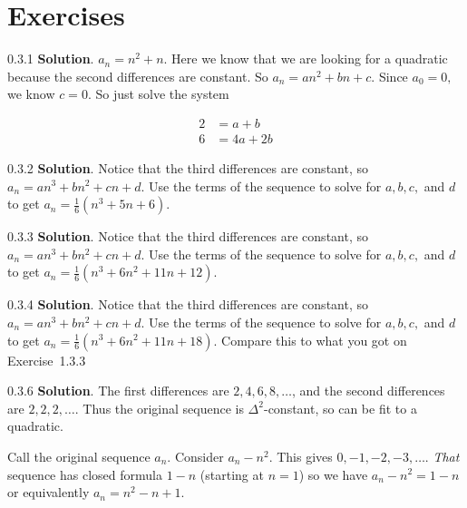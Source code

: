\documentclass[11pt,]{book}
\theoremstyle{ptxplainnotitle}
\theoremstyle{ptxplaintitle}
\theoremstyle{ptxdefinitionnotitle}
\theoremstyle{ptxdefinitiontitle}
\theoremstyle{ptxdefinitionnotitle}
\theoremstyle{ptxdefinitiontitle}
\theoremstyle{ptxdefinitionnotitle}
\theoremstyle{ptxdefinitiontitle}
\theoremstyle{ptxdefinitiontitlenonumber}
\theoremstyle{ptxdefinitiontitlenonumber}
\numberwithin{equation}{chapter}
\newcommand{\amp}{&}
\begin{document}
\section*{Exercises}
\begin{divisionexercise}{0.3.1}
\textbf{Solution}.\quad%
\hypertarget{p-391}{}%
\(a_n = n^2 + n\text{.}\)  Here we know that we are looking for a quadratic because the second differences are constant.  So \(a_n = an^2 + bn + c\text{.}\)  Since \(a_0 = 0\text{,}\) we know \(c= 0\text{.}\)  So just solve the system%
\par
\hypertarget{p-392}{}%
%
\begin{equation*}
\begin{aligned}
2 \amp = a + b \\
6 \amp = 4a + 2b 
\end{aligned}
\end{equation*}
%
\end{divisionexercise}%
\begin{divisionexercise}{0.3.2}
\textbf{Solution}.\quad%
\hypertarget{p-397}{}%
Notice that the third differences are constant, so \(a_n = an^3 + bn^2 + cn + d\text{.}\) Use the terms of the sequence to solve for \(a, b, c,\) and \(d\) to get \(a_n = \frac{1}{6} (n^3 + 5n + 6)\text{.}\)%
\end{divisionexercise}%
\begin{divisionexercise}{0.3.3}
\textbf{Solution}.\quad%
\hypertarget{p-402}{}%
Notice that the third differences are constant, so \(a_n = an^3 + bn^2 + cn + d\text{.}\) Use the terms of the sequence to solve for \(a, b, c,\) and \(d\) to get \(a_n = \frac{1}{6} (n^3 + 6n^2 + 11n + 12)\text{.}\)%
\end{divisionexercise}%
\begin{divisionexercise}{0.3.4}
\textbf{Solution}.\quad%
\hypertarget{p-407}{}%
Notice that the third differences are constant, so \(a_n = an^3 + bn^2 + cn + d\text{.}\) Use the terms of the sequence to solve for \(a, b, c,\) and \(d\) to get \(a_n = \frac{1}{6} (n^3 + 6n^2 + 11n + 18)\text{.}\)  Compare this to what you got on Exercise~1.3.3%
\end{divisionexercise}%
\begin{divisionexercise}{0.3.6}
\textbf{Solution}.\quad%
\hypertarget{p-410}{}%
The first differences are \(2, 4, 6, 8, \ldots\), and the second differences are \(2, 2, 2, \ldots\). Thus the original sequence is \(\Delta^2\)-constant, so can be fit to a quadratic.%
\par
\hypertarget{p-411}{}%
Call the original sequence \(a_n\). Consider \(a_n - n^2\). This gives \(0, -1, -2, -3, \ldots\). \emph{That} sequence has closed formula \(1-n\) (starting at \(n = 1\)) so we have \(a_n - n^2 = 1-n\) or equivalently \(a_n = n^2 - n + 1\).%
\end{divisionexercise}%
\end{document}
